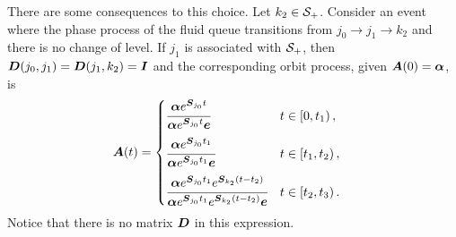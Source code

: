 There are some consequences to this choice. Let \(k_2\in \mathcal{S}_+\). Consider an event where the phase process of the fluid queue transitions from \({j_0}\to {j_1}\to k_2\) and there is no change of level. If \({j_1}\) is associated with \(\mathcal{S}_+\), then \(\boldsymbol{D}({j_0},{j_1})=\boldsymbol{D}({j_1},k_2)=\boldsymbol{I}\) and the corresponding orbit process, given \(\boldsymbol A(0) = \boldsymbol \alpha\), is 
\begin{align*}
\boldsymbol A(t) &= \begin{cases} 
	\cfrac{\boldsymbol \alpha e^{\boldsymbol{S}_{j_0}t}}{\boldsymbol \alpha e^{\boldsymbol{S}_{{j_0}}t}\boldsymbol e} & t\in\left[0,t_1\right), \\[10pt]
	\cfrac{\boldsymbol \alpha e^{\boldsymbol{S}_{j_0}t_1}}{\boldsymbol \alpha e^{\boldsymbol{S}_{j_0}t_1}\boldsymbol e} & t\in\left[t_1,t_2\right), \\[10pt] 
	\cfrac{\boldsymbol \alpha e^{\boldsymbol{S}_{j_0}t_1}e^{\boldsymbol{S}_{k_2}(t-t_2)}}{\boldsymbol \alpha e^{\boldsymbol{S}_{j_0}t_1}e^{\boldsymbol{S}_{k_2}(t-t_2)}\boldsymbol e} & t\in\left[t_2,t_3\right).
\end{cases}
\end{align*}
Notice that there is no matrix \(\boldsymbol D\) in this expression. 

